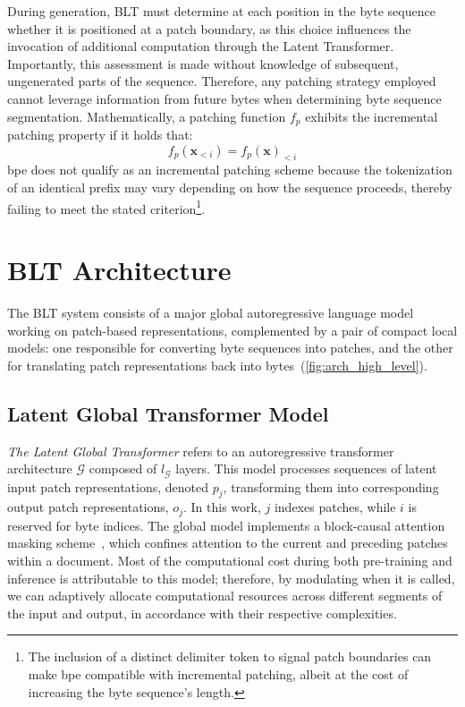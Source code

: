 During generation, {\textsc BLT} must determine at each position in the byte sequence whether it is positioned at a patch boundary, as this choice influences the invocation of additional computation through the Latent Transformer. Importantly, this assessment is made without knowledge of subsequent, ungenerated parts of the sequence. Therefore, any patching strategy employed cannot leverage information from future bytes when determining byte sequence segmentation. Mathematically, a patching function $f_p$ exhibits the incremental patching property if it holds that:
$$f_p(\pmb{x}_{<i}) = f_p(\pmb{x})_{<i}$$
bpe does not qualify as an incremental patching scheme because the tokenization of an identical prefix may vary depending on how the sequence proceeds, thereby failing to meet the stated criterion\footnote{The inclusion of a distinct delimiter token to signal patch boundaries can make bpe compatible with incremental patching, albeit at the cost of increasing the byte sequence's length.}.

\section{{\textsc BLT} Architecture}
\label{section:architecture}
The {\textsc BLT} system consists of a major global autoregressive language model working on patch-based representations, complemented by a pair of compact local models: one responsible for converting byte sequences into patches, and the other for translating patch representations back into bytes~(\autoref{fig:arch_high_level}).

\subsection{Latent Global Transformer Model}

\textit{The Latent Global Transformer} refers to an autoregressive transformer architecture $\mathcal{G}$ composed of $l_{\mathcal{G}}$ layers. This model processes sequences of latent input patch representations, denoted $p_j$, transforming them into corresponding output patch representations, $o_j$. In this work, $j$ indexes patches, while $i$ is reserved for byte indices. The global model implements a block-causal attention masking scheme~\citep{dubey2024llama}, which confines attention to the current and preceding patches within a document. Most of the computational cost during both pre-training and inference is attributable to this model; therefore, by modulating when it is called, we can adaptively allocate computational resources across different segments of the input and output, in accordance with their respective complexities.

